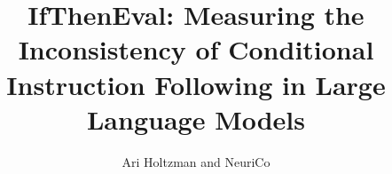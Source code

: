 \documentclass{article}
\title{IfThenEval: Measuring the Inconsistency of Conditional Instruction Following in Large Language Models}
\author{Ari Holtzman and NeuriCo}
\begin{document}
\maketitle

\begin{abstract}

\end{abstract}










\end{document}
